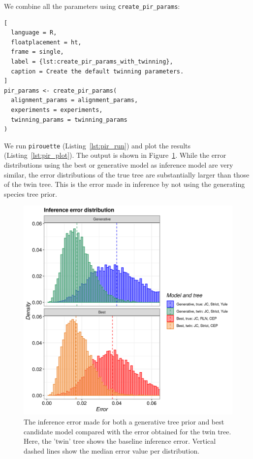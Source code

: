 We combine all the parameters using \verb;create_pir_params;:

\begin{lstlisting}[
  language = R,
  floatplacement = ht,
  frame = single,
  label = {lst:create_pir_params_with_twinning},
  caption = Create the default twinning parameters.
]
pir_params <- create_pir_params(
  alignment_params = alignment_params,
  experiments = experiments,
  twinning_params = twinning_params
)
\end{lstlisting}

We run \verb;pirouette; (Listing~\ref{lst:pir_run}) 
and plot the results (Listing~\ref{lst:pir_plot}).
The output is shown in Figure~\ref{fig:example_3}. 
While the error distributions using the best or generative model 
as inference model are very similar, 
the error distributions of the true tree are substantially 
larger than those of the twin tree. 
This is the error made in inference 
by not using the generating species tree prior.

\begin{figure}[H]
  \includegraphics[width=\textwidth]{example_3/errors.png}
  \caption{
    The inference error made 
    for both a generative tree prior and best candidate model
    compared with the error obtained for the twin tree.
    Here, the 'twin' tree shows the baseline inference error.
    Vertical dashed lines show the median error value per distribution.
  }
  \label{fig:example_3}
\end{figure}

